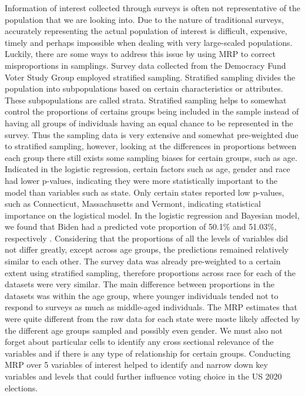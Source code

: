 \documentclass[
]{article}
\begin{document}
Information of interest collected through surveys is often not representative of the population that we are looking into. Due to the nature of traditional surveys, accurately representing the actual population of interest is difficult, expensive, timely and perhaps impossible when dealing with very large-scaled populations. Luckily, there are some ways to address this issue by using MRP to correct misproportions in samplings. Survey data collected from the Democracy Fund Voter Study Group employed stratified sampling. Stratified sampling divides the population into subpopulations based on certain characteristics or attributes. These subpopulations are called strata. Stratified sampling helps to somewhat control the proportions of certains groups being included in the sample instead of having all groups of individuals having an equal chance to be represented in the survey. Thus the sampling data is very extensive and somewhat pre-weighted due to stratified sampling, however, looking at the differences in proportions between each group there still exists some sampling biases for certain groups, such as age. Indicated in the logistic regression, certain factors such as age, gender and race had lower p-values, indicating they were more statistically important to the model than variables such as state. Only certain states reported low p-values, such as Connecticut, Massachusetts and Vermont, indicating statistical importance on the logistical model.
In the logistic regression and Bayesian model, we found that Biden had a predicted vote proportion of 50.1\% and 51.03\%, respectively . Considering that the proportions of all the levels of variables did not differ greatly, except across age groups, the predictions remained relatively similar to each other. The survey data was already pre-weighted to a certain extent using stratified sampling, therefore proportions across race for each of the datasets were very similar. The main difference between proportions in the datasets was within the age group, where younger individuals tended not to respond to surveys as much as middle-aged individuals. The MRP estimates that were quite different from the raw data for each state were moste likely affected by the different age groups sampled and possibly even gender. We must also not forget about particular cells to identify any cross sectional relevance of the variables and if there is any type of relationship for certain groups. Conducting MRP over 5 variables of interest helped to identify and narrow down key variables and levels that could further influence voting choice in the US 2020 elections.
\end{document}
